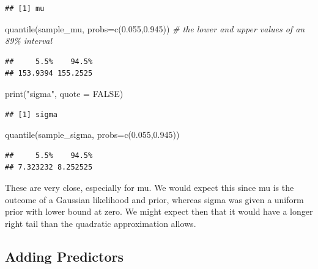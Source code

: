 \documentclass[
]{book}
\newenvironment{Shaded}{\begin{snugshade}}{\end{snugshade}}
\newcommand{\AttributeTok}[1]{\textcolor[rgb]{0.77,0.63,0.00}{#1}}
\newcommand{\CommentTok}[1]{\textcolor[rgb]{0.56,0.35,0.01}{\textit{#1}}}
\newcommand{\ConstantTok}[1]{\textcolor[rgb]{0.00,0.00,0.00}{#1}}
\newcommand{\FloatTok}[1]{\textcolor[rgb]{0.00,0.00,0.81}{#1}}
\newcommand{\FunctionTok}[1]{\textcolor[rgb]{0.00,0.00,0.00}{#1}}
\newcommand{\NormalTok}[1]{#1}
\newcommand{\StringTok}[1]{\textcolor[rgb]{0.31,0.60,0.02}{#1}}
\begin{document}
\begin{verbatim}
## [1] mu
\end{verbatim}

\begin{Shaded}
\begin{Highlighting}[]
\FunctionTok{quantile}\NormalTok{(sample\_mu, }\AttributeTok{probs=}\FunctionTok{c}\NormalTok{(}\FloatTok{0.055}\NormalTok{,}\FloatTok{0.945}\NormalTok{)) }\CommentTok{\# the lower and upper values of an 89\% interval}
\end{Highlighting}
\end{Shaded}

\begin{verbatim}
##     5.5%    94.5% 
## 153.9394 155.2525
\end{verbatim}

\begin{Shaded}
\begin{Highlighting}[]
\FunctionTok{print}\NormalTok{(}\StringTok{"sigma"}\NormalTok{, }\AttributeTok{quote =} \ConstantTok{FALSE}\NormalTok{)}
\end{Highlighting}
\end{Shaded}

\begin{verbatim}
## [1] sigma
\end{verbatim}

\begin{Shaded}
\begin{Highlighting}[]
\FunctionTok{quantile}\NormalTok{(sample\_sigma, }\AttributeTok{probs=}\FunctionTok{c}\NormalTok{(}\FloatTok{0.055}\NormalTok{,}\FloatTok{0.945}\NormalTok{))}
\end{Highlighting}
\end{Shaded}

\begin{verbatim}
##     5.5%    94.5% 
## 7.323232 8.252525
\end{verbatim}

These are very close, especially for mu. We would expect this since mu is the outcome of a Gaussian likelihood and prior, whereas sigma was given a uniform prior with lower bound at zero. We might expect then that it would have a longer right tail than the quadratic approximation allows.

\hypertarget{adding-predictors}{%
\subsection{Adding Predictors}\label{adding-predictors}}
\end{document}
